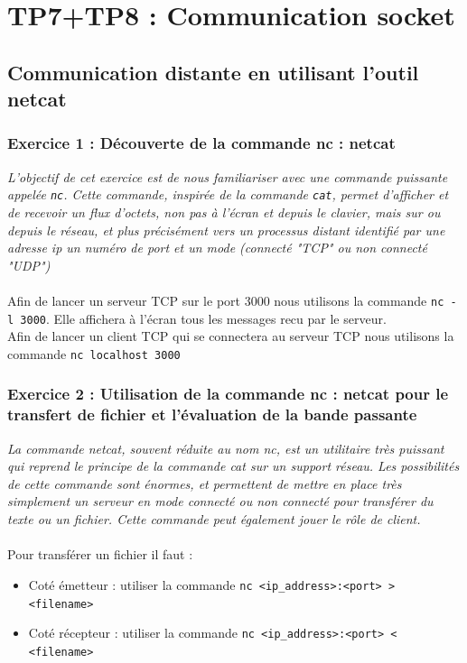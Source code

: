 \chapter{TP7+TP8 : Communication socket}

\section{Communication distante en utilisant l’outil netcat}

\subsection{Exercice 1 : Découverte de la commande nc : netcat}
\textit{L’objectif de cet exercice est de nous familiariser avec une commande puissante appelée \texttt{nc}. Cette commande, inspirée de la commande \texttt{cat}, permet d’afficher et de recevoir un flux d’octets, non pas à l’écran et depuis le clavier, mais sur ou depuis le réseau, et plus précisément vers un processus distant identifié par une adresse ip un numéro de port et un mode (connecté "TCP" ou non connecté "UDP")}
\\\\
Afin de lancer un serveur TCP sur le port 3000 nous utilisons la commande \texttt{nc -l 3000}. Elle affichera à l'écran tous les messages recu par le serveur.\\
Afin de lancer un client TCP qui se connectera au serveur TCP nous utilisons la commande \texttt{nc localhost 3000}

\subsection{Exercice 2 : Utilisation de la commande nc : netcat pour le transfert de fichier et l’évaluation de la bande passante}
\textit{La commande netcat, souvent réduite au nom nc, est un utilitaire très puissant qui reprend le principe de la commande cat sur un support réseau. Les possibilités de cette commande sont énormes, et permettent de mettre en place très simplement un serveur en mode connecté ou non connecté pour transférer du texte ou un fichier. Cette commande peut également jouer le rôle de client.}
\\\\
Pour transférer un fichier il faut :
\begin{itemize}
  \item Coté émetteur : utiliser la commande \texttt{nc <ip_address>:<port> > <filename>}
  \item Coté récepteur : utiliser la commande \texttt{nc <ip_address>:<port> < <filename>}
\end{itemize}


